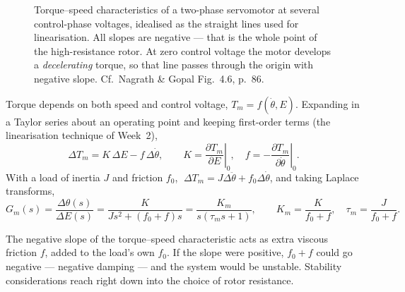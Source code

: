 \documentclass[11pt,a4paper]{article}
\begin{document}
\begin{figure}[htbp]
\centering
{}
\caption{Torque--speed characteristics of a two-phase servomotor at several
control-phase voltages, idealised as the straight lines used for linearisation.
All slopes are negative --- that is the whole point of the high-resistance
rotor. At zero control voltage the motor develops a \emph{decelerating} torque,
so that line passes through the origin with negative slope. Cf.\ Nagrath \&
Gopal Fig.~4.6, p.~86.}
\label{fig:acservo}
\end{figure}

Torque depends on both speed and control voltage, $T_m=f(\dot\theta,E)$. Expanding
in a Taylor series about an operating point and keeping first-order terms
(the linearisation technique of Week~2),
\[
  \Delta T_m = K\,\Delta E - f\,\Delta\dot\theta,
  \qquad
  K=\left.\frac{\partial T_m}{\partial E}\right|_0,\quad
  f=-\left.\frac{\partial T_m}{\partial \dot\theta}\right|_0 .
\]
With a load of inertia $J$ and friction $f_0$, $\;\Delta T_m=J\Delta\ddot\theta
+f_0\Delta\dot\theta$, and taking Laplace transforms,
\begin{equation}
  G_m(s)=\frac{\Delta\theta(s)}{\Delta E(s)}
        =\frac{K}{Js^2+(f_0+f)s}
        =\frac{K_m}{s(\tau_m s+1)},
  \qquad K_m=\frac{K}{f_0+f},\quad \tau_m=\frac{J}{f_0+f}.
  \label{eq:acm}
\end{equation}

\begin{keyidea}
The negative slope of the torque--speed characteristic acts as extra viscous
friction $f$, added to the load's own $f_0$. If the slope were positive,
$f_0+f$ could go negative --- negative damping --- and the system would be
unstable. Stability considerations reach right down into the choice of rotor
resistance.
\end{keyidea}
\end{document}
